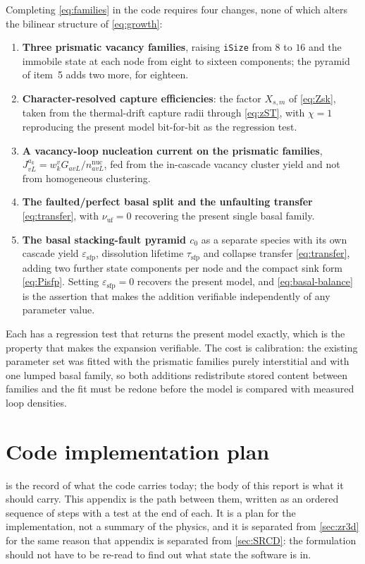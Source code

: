 \documentclass{article}
\begin{document}
Completing \cref{eq:families} in the code requires four changes, none of which
alters the bilinear structure of \cref{eq:growth}:
\begin{enumerate}
\item \textbf{Three prismatic vacancy families}, raising \texttt{iSize} from $8$
      to $16$ and the immobile state at each node from eight to sixteen
      components; the pyramid of item~5 adds two more, for eighteen.
\item \textbf{Character-resolved capture efficiencies}: the factor $X_{s,m}$ of
      \cref{eq:Zsk}, taken from the thermal-drift capture radii through
      \cref{eq:zST}, with $\chi=1$ reproducing the present model bit-for-bit as
      the regression test.
\item \textbf{A vacancy-loop nucleation current on the prismatic families},
      $J^{a_k}_{vL}=w^v_kG_{avL}/n^{\mathrm{nuc}}_{avL}$, fed from the in-cascade
      vacancy cluster yield and not from homogeneous clustering.
\item \textbf{The faulted/perfect basal split and the unfaulting transfer}
      \cref{eq:transfer}, with $\nu_{\mathrm{uf}}=0$ recovering the present single
      basal family.
\item \textbf{The basal stacking-fault pyramid $c_0$} as a separate species with
      its own cascade yield $\varepsilon_{\mathrm{sfp}}$, dissolution lifetime
      $\tau_{\mathrm{sfp}}$ and collapse transfer \cref{eq:transfer}, adding two
      further state components per node and the compact sink form
      \cref{eq:Pisfp}. Setting $\varepsilon_{\mathrm{sfp}}=0$ recovers the present
      model, and \cref{eq:basal-balance} is the assertion that makes the addition
      verifiable independently of any parameter value.
\end{enumerate}
Each has a regression test that returns the present model exactly, which is the
property that makes the expansion verifiable. The cost is calibration: the
existing parameter set was fitted with the prismatic families purely interstitial
and with one lumped basal family, so both additions redistribute stored content
between families and the fit must be redone before the model is compared with
measured loop densities.

\section{Code implementation plan}
\label{app:plan}

 is the record of what the code carries today; the body of this
report is what it should carry. This appendix is the path between them, written
as an ordered sequence of steps with a test at the end of each. It is a plan for
the implementation, not a summary of the physics, and it is separated from
\cref{sec:zr3d} for the same reason that appendix is separated from
\cref{sec:SRCD}: the formulation should not have to be re-read to find out what
state the software is in.
\end{document}
